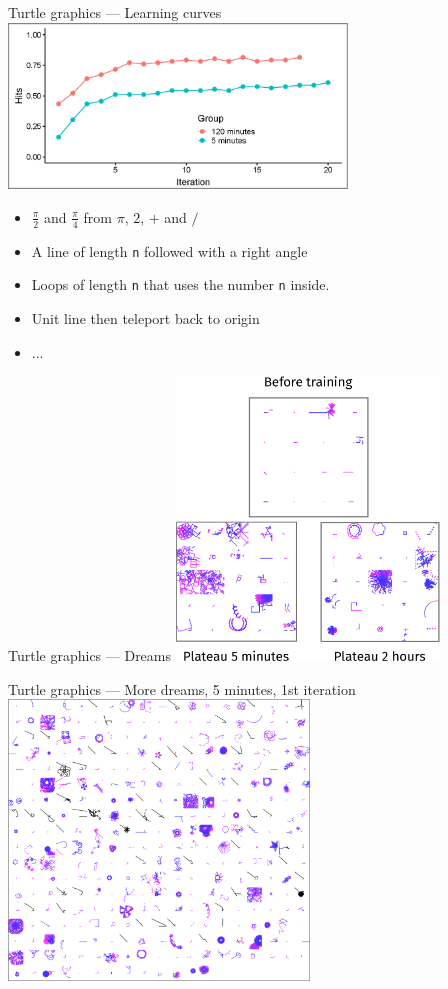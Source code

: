 \documentclass{beamer}
\begin{document}
\begin{frame}{Turtle graphics --- Learning curves}
  \centering
  \includegraphics[width=9cm]{figures/dreams/montageTalkLC.eps}
  \pause{}
  \begin{itemize}
    \item $\frac\pi2$ and $\frac\pi4$ from $\pi$, $2$, $+$ and $/$
    \item A line of length \texttt{n} followed with a right angle
    \item Loops of length \texttt{n} that uses the number \texttt{n} inside.
    \item Unit line then teleport back to origin
    \item ...
  \end{itemize}
\end{frame}

\begin{frame}{Turtle graphics --- Dreams}
  \centering
  \includegraphics[width=7cm]{figures/dreams/montageTalkDreams.eps}
\end{frame}

\begin{frame}{Turtle graphics --- More dreams, 5 minutes, 1st iteration}
  \centering
  \includegraphics[width=8cm]{figures/dreams/5m_firstIteration.eps}
\end{frame}
\end{document}

